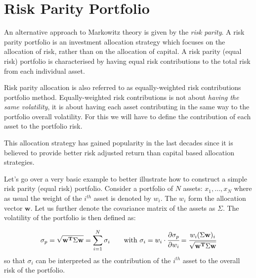 \section{Risk Parity Portfolio}
\label{risk-parity-portfolio}

An alternative approach to Markowitz theory is given by the \emph{risk parity}. A risk parity portfolio is an investment allocation strategy which focuses on the allocation of risk, rather than on the allocation of capital. 
A risk parity (equal risk) portfolio is characterised by having equal risk contributions to the total risk from each individual asset. 

Risk parity allocation is also referred to as equally-weighted risk contributions portfolio method. Equally-weighted risk contributions is not about \emph{having the same volatility}, it is about having each asset contributing in the same way to the portfolio overall volatility. For this we will have to define the contribution of each asset to the portfolio risk. 

This allocation strategy has gained popularity in the last decades since it is believed to provide better risk adjusted return than capital based allocation strategies.

Let's go over a very basic example to better illustrate how to construct a simple risk parity (equal risk) portfolio. Consider a portfolio of \(N\) assets: \(x_{1}, \ldots, x_N\) where as
usual the weight of the $i^{th}$ asset is denoted by \(w_{i}\). The \(w_{i}\) form the allocation vector \(\mathbf{w}\). Let us further denote the covariance matrix of the assets as \(\Sigma\). The volatility of the portfolio is then defined as:

\begin{equation} 
\sigma_p={\sqrt {\mathbf{w^T}\Sigma \mathbf{w}}} = \sum_{i=1}^{N}\sigma _{i}\qquad\textrm{with}~\sigma _{i} = w_{i}\cdot \cfrac{\partial\sigma_p}{\partial w_{i}}={\cfrac {w_{i}(\Sigma \mathbf{w})_{i}}{\sqrt {\mathbf{w^T}\Sigma \mathbf{w}}}}
\end{equation}
so that \(\sigma _{i}\) can be interpreted as the contribution of the $i^{th}$ asset to the overall risk of the portfolio.

